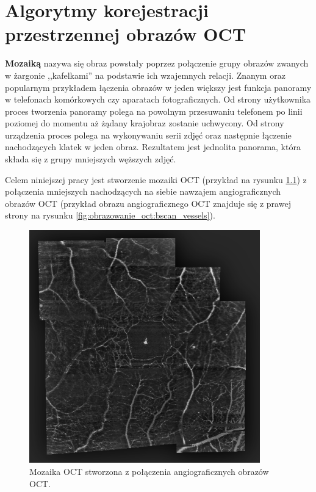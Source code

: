 %
\chapter{Algorytmy korejestracji przestrzennej obrazów OCT}
\label{sec:algorytmy_korejestracji}

\textbf{Mozaiką} nazywa się obraz powstały poprzez połączenie grupy obrazów zwanych w żargonie ,,kafelkami'' na podstawie ich wzajemnych relacji. Znanym oraz popularnym przykładem łączenia obrazów w jeden większy jest funkcja panoramy w telefonach komórkowych czy aparatach fotograficznych. Od strony użytkownika proces tworzenia panoramy polega na powolnym przesuwaniu telefonem po linii poziomej do momentu aż żądany krajobraz zostanie uchwycony. Od strony urządzenia proces polega na wykonywaniu serii zdjęć oraz następnie łączenie nachodzących klatek w jeden obraz. Rezultatem jest jednolita panorama, która składa się z grupy mniejszych węższych zdjęć.

Celem niniejszej pracy jest stworzenie mozaiki OCT (przykład na rysunku \ref{fig:algorytmy_korejestracji:mosaic}) z połączenia mniejszych nachodzących na siebie nawzajem angiograficznych obrazów OCT (przykład obrazu angiograficznego OCT znajduje się z prawej strony na rysunku \ref{fig:obrazowanie_oct:bscan_vessels}).

\begin{figure}[H]
  \centering
  \includegraphics[width=10cm]{gfx/mosaic}
  \caption{Mozaika OCT stworzona z połączenia angiograficznych obrazów OCT.}
  \label{fig:algorytmy_korejestracji:mosaic}
\end{figure}

